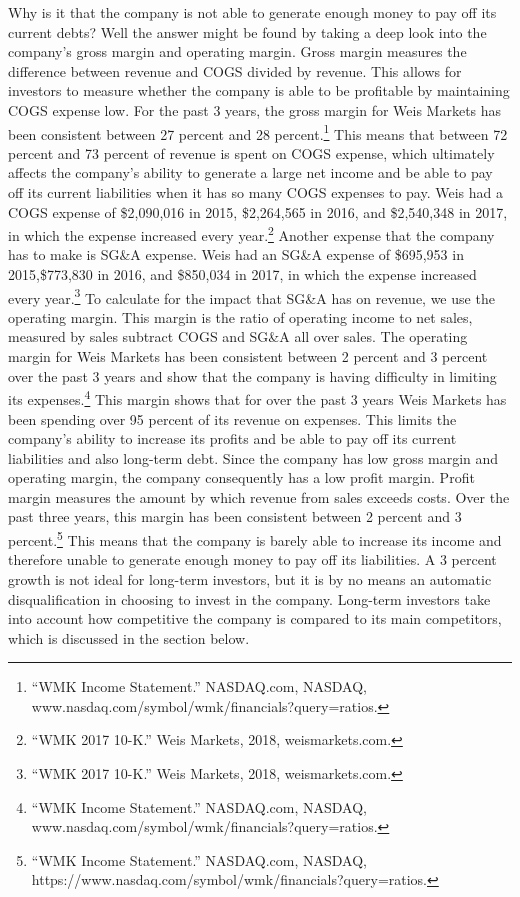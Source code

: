 \documentclass[12pt]{article}
\begin{document}
\begin{doublespacing}
Why is it that the company is not able to generate enough money to pay off its current debts? Well the answer might be found by taking a deep look into the company’s gross margin and operating margin. Gross margin measures the difference between revenue and COGS divided by revenue. This allows for investors to measure whether the company is able to be profitable by maintaining COGS expense low. For the past 3 years, the gross margin for Weis Markets has been consistent between 27 percent and 28 percent.\footnote{“WMK Income Statement.” NASDAQ.com, NASDAQ, www.nasdaq.com/symbol/wmk/financials?query=ratios.} This means that between 72 percent and 73 percent of revenue is spent on COGS expense, which ultimately affects the company’s ability to generate a large net income and be able to pay off its current liabilities when it has so many COGS expenses to pay. Weis had a COGS expense of \$2,090,016 in 2015, \$2,264,565 in 2016, and \$2,540,348 in 2017, in which the expense increased every year.\footnote{“WMK 2017 10-K.” Weis Markets, 2018, weismarkets.com.} Another expense that the company has to make is SG\&A expense. Weis had an SG&A expense of \$695,953 in 2015,\$773,830 in 2016, and \$850,034 in 2017, in which the expense increased every year.\footnote{“WMK 2017 10-K.” Weis Markets, 2018, weismarkets.com.} To calculate for the impact that SG\&A has on revenue, we use the operating margin. This margin is the ratio of operating income to net sales, measured by sales subtract COGS and SG\&A all over sales. The operating margin for Weis Markets has been consistent between 2 percent and 3 percent over the past 3 years and show that the company is having difficulty in limiting its expenses.\footnote{“WMK Income Statement.” NASDAQ.com, NASDAQ, www.nasdaq.com/symbol/wmk/financials?query=ratios.} This margin shows that for over the past 3 years Weis Markets has been spending over 95 percent of its revenue on expenses. This limits the company’s ability to increase its profits and be able to pay off its current liabilities and also long-term debt.
Since the company has low gross margin and operating margin, the company consequently has a low profit margin. Profit margin measures the amount by which revenue from sales exceeds costs. Over the past three years, this margin has been consistent between 2 percent and 3 percent.\footnote{“WMK Income Statement.” NASDAQ.com, NASDAQ, https://www.nasdaq.com/symbol/wmk/financials?query=ratios.} This means that the company is barely able to increase its income and therefore unable to generate enough money to pay off its liabilities. A 3 percent growth is not ideal for long-term investors, but it is by no means an automatic disqualification in choosing to invest in the company. Long-term investors take into account how competitive the company is compared to its main competitors, which is discussed in the section below.
\\


\end{doublespacing}
\end{document}
